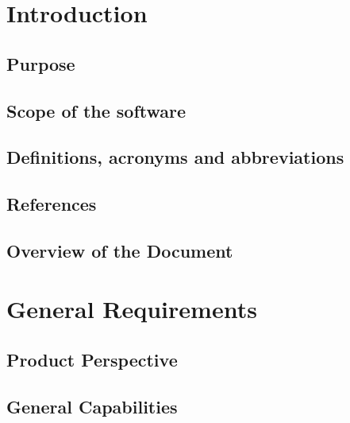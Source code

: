 \def\thedocument{Ures Requirements Document}
\def\thedate{DATE} %
\def\theversion{0.1}
\def\thestatus{Working copy}






\section{Introduction}
  \subsection{Purpose}
    

  \subsection{Scope of the software}
    

  \subsection{Definitions, acronyms and abbreviations}
    

  \subsection{References}
    

  \subsection{Overview of the Document}
    


\section{General Requirements}
  \subsection{Product Perspective}
    

  \subsection{General Capabilities}
    

